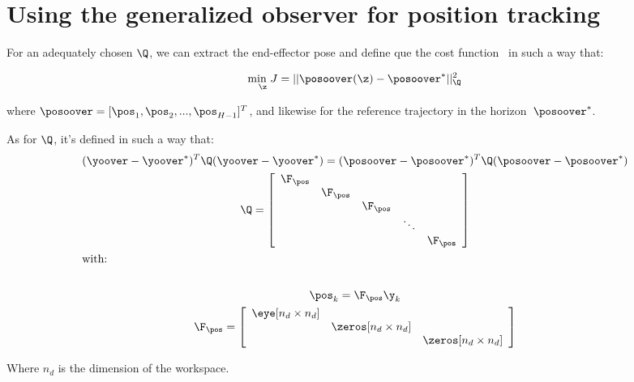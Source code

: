 \section{Using the generalized observer for position tracking}
For an adequately chosen $\Q$, we can extract the end-effector pose and
define que the cost function~ in such a way that:

\begin{gather}
  \underset{\z}{\text{min }J} = ||\posoover(\z) - \posoover^*||^2_{\Q} \label{eqn:mpc_pos_cost}
\end{gather}

where $\posoover = [\pos_1,\pos_2, ..., \pos_{H-1}]^T$, and likewise for the
reference trajectory in the horizon~$\posoover^*$.

As for $\Q$, it's defined in such a way that:
\begin{gather}
  (\yoover - \yoover^*)^T\Q(\yoover - \yoover^*) =
  (\posoover - \posoover^*)^T\Q(\posoover - \posoover^*) \\
  \Q = \left[
    \begin{array}{ccccc}
      \F_{\pos} \\
      & \F_{\pos} \\
      & & \F_{\pos} \\
      &&&\ddots \\
      & & & & \F_{\pos} \\
    \end{array}\right] \\
\shortintertext{with:} \nonumber\\
\pos_k = \F_{\pos} \y_k \\
\F_{\pos}=
\left[
  \begin{array}{ccc}
    \eye[ n_d\times n_d ] \\
    & \zeros[ n_d\times n_d ] \\
    & & \zeros[ n_d\times n_d ]
  \end{array}\right]
\end{gather}

Where $n_d$ is the dimension of the workspace.

